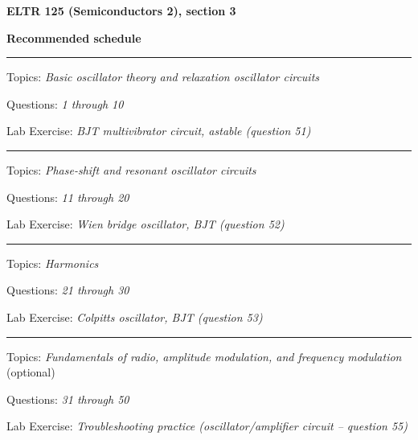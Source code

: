 
\centerline{\bf ELTR 125 (Semiconductors 2), section 3} \bigskip 
 
\vskip 10pt

\noindent
{\bf Recommended schedule}

\vskip 5pt

\hrule \vskip 5pt
\noindent
{}

\hskip 10pt Topics: {\it Basic oscillator theory and relaxation oscillator circuits}
 
\hskip 10pt Questions: {\it 1 through 10}
 
\hskip 10pt Lab Exercise: {\it BJT multivibrator circuit, astable (question 51)}
 
\vskip 10pt
\hrule \vskip 5pt
\noindent
{}

\hskip 10pt Topics: {\it Phase-shift and resonant oscillator circuits}
 
\hskip 10pt Questions: {\it 11 through 20}
 
\hskip 10pt Lab Exercise: {\it Wien bridge oscillator, BJT (question 52)}
 
 
\vskip 10pt
\hrule \vskip 5pt
\noindent
{}

\hskip 10pt Topics: {\it Harmonics}
 
\hskip 10pt Questions: {\it 21 through 30}
 
\hskip 10pt Lab Exercise: {\it Colpitts oscillator, BJT (question 53)}
 




\vskip 10pt
\hrule \vskip 5pt
\noindent
{}

\hskip 10pt Topics: {\it Fundamentals of radio, amplitude modulation, and frequency modulation} (optional)
 
\hskip 10pt Questions: {\it 31 through 50}
 
\hskip 10pt Lab Exercise: {\it Troubleshooting practice (oscillator/amplifier circuit -- question 55)}


